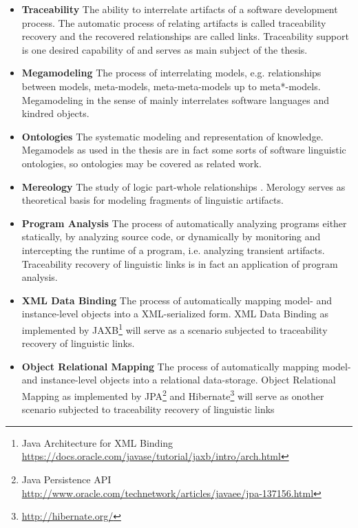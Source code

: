\documentclass[runningheads,a4paper]{llncs}
\newcommand{\footnoteurl}[1]{\footnote{\url{#1}}}
\newcommand{\megal}{\text{MegaL}}
\begin{document}
\begin{itemize}

\item
\textbf{Traceability}
The ability to interrelate artifacts of a software development process.
The automatic process of relating artifacts is called traceability recovery and the recovered relationships are called links.
Traceability support is one desired capability of \megal and serves as main subject of the thesis.

\item
\textbf{Megamodeling}
The process of interrelating models, e.g. relationships between models, meta-models, meta-meta-models up to meta*-models.
Megamodeling in the sense of \megal mainly interrelates software languages and kindred objects.

\item
\textbf{Ontologies}
The systematic modeling and representation of knowledge.
Megamodels as used in the thesis are in fact some sorts of software linguistic ontologies, so ontologies may be covered as related work.

\item
\textbf{Mereology}
The study of logic part-whole relationships \cite{DBLP:journals/dke/Varzi96}.
Merology serves as theoretical basis for modeling fragments of linguistic artifacts.

\item
\textbf{Program Analysis}
The process of automatically analyzing programs either statically, by analyzing source code, or dynamically by monitoring and intercepting the runtime of a program, i.e. analyzing transient artifacts.
Traceability recovery of linguistic links is in fact an application of program analysis.

\item 
\textbf{XML Data Binding}
The process of automatically mapping model- and instance-level objects into a XML-serialized form.
XML Data Binding as  implemented by JAXB\footnote{Java Architecture for XML Binding \url{https://docs.oracle.com/javase/tutorial/jaxb/intro/arch.html}} will serve as a scenario subjected to traceability recovery of linguistic links.

\item
\textbf{Object Relational Mapping}
The process of automatically mapping model- and instance-level objects into a relational data-storage.
Object Relational Mapping as implemented by JPA\footnote{Java Persistence API \url{http://www.oracle.com/technetwork/articles/javaee/jpa-137156.html}} and Hibernate\footnoteurl{http://hibernate.org/} will serve as onother scenario subjected to traceability recovery of linguistic links


\end{itemize}
\end{document}
